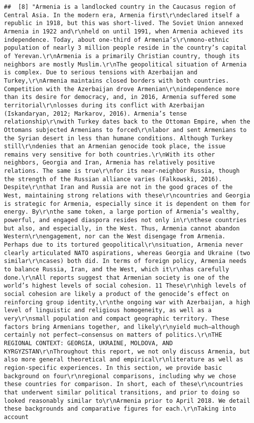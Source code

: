 \documentclass[
]{article}
\begin{document}
\begin{verbatim}
##  [8] "Armenia is a landlocked country in the Caucasus region of Central Asia. In the modern era, Armenia first\r\ndeclared itself a republic in 1918, but this was short-lived. The Soviet Union annexed Armenia in 1922 and\r\nheld on until 1991, when Armenia achieved its independence. Today, about one-third of Armenia’s\r\nmono-ethnic population of nearly 3 million people reside in the country’s capital of Yerevan.\r\nArmenia is a primarily Christian country, though its neighbors are mostly Muslim.\r\nThe geopolitical situation of Armenia is complex. Due to serious tensions with Azerbaijan and Turkey,\r\nArmenia maintains closed borders with both countries. Competition with the Azerbaijan drove Armenian\r\nindependence more than its desire for democracy, and, in 2016, Armenia suffered some territorial\r\nlosses during its conflict with Azerbaijan (Iskandaryan, 2012; Markarov, 2016). Armenia’s tense relationship\r\nwith Turkey dates back to the Ottoman Empire, when the Ottomans subjected Armenians to forced\r\nlabor and sent Armenians to the Syrian desert in less than humane conditions. Although Turkey still\r\ndenies that an Armenian genocide took place, the issue remains very sensitive for both countries.\r\nWith its other neighbors, Georgia and Iran, Armenia has relatively positive relations. The same is true\r\nfor its near-neighbor Russia, though the strength of the Russian alliance varies (Falkowski, 2016). Despite\r\nthat Iran and Russia are not in the good graces of the West, maintaining strong relations with these\r\ncountries and Georgia is strategic for Armenia, especially since it is dependent on them for energy. By\r\nthe same token, a large portion of Armenia’s wealthy, powerful, and engaged diaspora resides not only in\r\nthese countries but also, and especially, in the West. Thus, Armenia cannot abandon Western\r\nengagement, nor can the West disengage from Armenia. Perhaps due to its tortured geopolitical\r\nsituation, Armenia never clearly articulated NATO aspirations, whereas Georgia and Ukraine (two similar\r\ncases) both did. In terms of foreign policy, Armenia needs to balance Russia, Iran, and the West, which it\r\nhas carefully done.\r\nAll reports suggest that Armenian society is one of the world’s highest levels of social cohesion. 11 These\r\nhigh levels of social cohesion are likely a product of the genocide’s effect on reinforcing group identity,\r\nthe ongoing war with Azerbaijan, a high level of linguistic and religious homogeneity, as well as a very\r\nsmall population and compact geographic territory. These factors bring Armenians together, and likely\r\nyield much—although certainly not perfect—consensus on matters of politics.\r\nTHE REGIONAL CONTEXT: GEORGIA, UKRAINE, MOLDOVA, AND KYRGYZSTAN\r\nThroughout this report, we not only discuss Armenia, but also more general theoretical and empirical\r\nliterature as well as region-specific experiences. In this section, we provide basic background on four\r\nregional comparisons, including why we chose these countries for comparison. In short, each of these\r\ncountries that underwent similar political transitions, and prior to doing so looked reasonably similar to\r\nArmenia prior to April 2018. We detail these backgrounds and comparative figures for each.\r\nTaking into account 
\end{verbatim}
\end{document}
